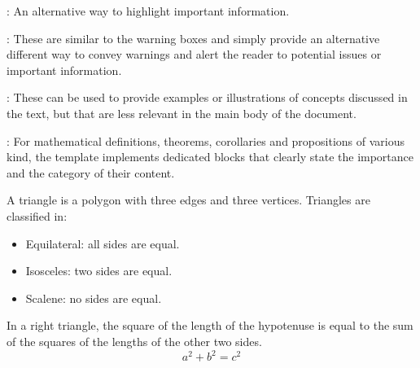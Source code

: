 \documentclass[../main.tex]{subfiles}
\begin{document}
: An alternative way to highlight important information.

\begin{important}
    \blindtext
\end{important}

\oline

: These are similar to the warning boxes and simply provide an alternative different way to convey warnings and alert the reader to potential issues or important information. 

\begin{caution}
    \blindtext
\end{caution}

\oline

: These can be used to provide examples or illustrations of concepts discussed in the text, but that are less relevant in the main body of the document.

\begin{example}
    \blindtext
\end{example}

\oline 

: For mathematical definitions, theorems, corollaries and propositions of various kind, the template implements dedicated blocks that clearly state the importance and the category of their content.

\begin{definition}[Triangle][triangle]
    A triangle is a polygon with three edges and three vertices. Triangles are classified in:
	\begin{itemize}
		\item Equilateral: all sides are equal.
		\item Isosceles: two sides are equal.
		\item Scalene: no sides are equal.
	\end{itemize}
\end{definition}

\begin{theorem}
    In a right triangle, the square of the length of the hypotenuse is equal to the sum of the squares of the lengths of the other two sides.
    \begin{equation*}
        a^2 + b^2 = c^2
    \end{equation*}
\end{theorem}
\end{document}
